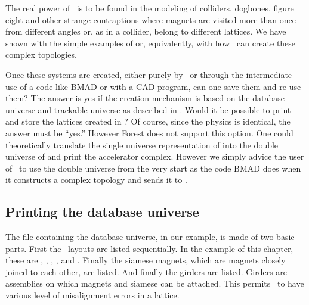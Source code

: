 The real power of \PTC\ is to be found in the modeling of colliders,
dogbones, figure eight and other strange contraptions where magnets
are visited more than once from different angles or, as in a collider,
belong to different lattices.  We have shown with the simple examples
of  or, equivalently, with
 how \PTC\ can create these complex
topologies.

Once these systems are created, either purely by \PTC\, or through the
intermediate use of a code like BMAD or with a CAD program, can one
save them and re-use them? The answer is yes if the creation mechanism
is based on the database universe  and trackable universe
 as described in . Would it be
possible to print and store the lattices created in
? Of course, since the physics is identical, the
answer must be ``yes.'' However Forest does not support this
option. One could theoretically translate the single universe
representation of  into the double universe of
 and print the accelerator complex. However
we simply advice the user of \PTC\ to use the double universe from the
very start as the code BMAD does when it constructs a complex topology
and sends it to \PTC .

\subsection{Printing the database universe}

The file containing the database universe,  in our
example, is made of two basic parts. First the \DNA\ layouts are
listed sequentially. In the example of this chapter, these are
, , , ,  and . Finally
the siamese magnets, which are magnets closely joined to each other,
are listed. And finally the girders are listed. Girders are assemblies
on which magnets and siamese can be attached. This permits \PTC\ to
have various level of misalignment errors in a lattice.
 
